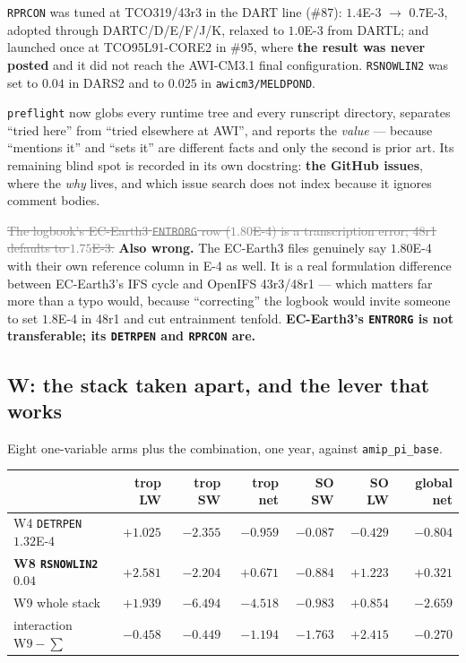 \documentclass[10pt]{article}
\newcommand{\dead}[1]{\textcolor{gray}{\sout{#1}}}
\begin{document}
\texttt{RPRCON} was tuned at TCO319/43r3 in the DART line (\#87): $1.4$E-3 $\to$
$0.7$E-3, adopted through DARTC/D/E/F/J/K, relaxed to $1.0$E-3 from DARTL; and launched
once at TCO95L91-CORE2 in \#95, where \textbf{the result was never posted} and it did not
reach the AWI-CM3.1 final configuration. \texttt{RSNOWLIN2} was set to $0.04$ in DARS2 and
to $0.025$ in \texttt{awicm3/MELDPOND}.

\texttt{preflight} now globs every runtime tree and every runscript directory, separates
``tried here'' from ``tried elsewhere at AWI'', and reports the \emph{value} --- because
``mentions it'' and ``sets it'' are different facts and only the second is prior art. Its
remaining blind spot is recorded in its own docstring: \textbf{the GitHub issues}, where
the \emph{why} lives, and which issue search does not index because it ignores comment
bodies.

\dead{The logbook's EC-Earth3 \texttt{ENTRORG} row ($1.80$E-4) is a transcription error;
48r1 defaults to $1.75$E-3.} \textbf{Also wrong.} The EC-Earth3 files genuinely say
$1.80$E-4 with their own reference column in E-4 as well. It is a real formulation
difference between EC-Earth3's IFS cycle and OpenIFS 43r3/48r1 --- which matters far more
than a typo would, because ``correcting'' the logbook would invite someone to set
$1.8$E-4 in 48r1 and cut entrainment tenfold. \textbf{EC-Earth3's \texttt{ENTRORG} is not
transferable; its \texttt{DETRPEN} and \texttt{RPRCON} are.}

\subsection{W: the stack taken apart, and the lever that works}\label{sub:r27w}
Eight one-variable arms plus the combination, one year, against \texttt{amip\_pi\_base}.

\begin{center}\footnotesize
\begin{tabular}{l r r r r r r}
\toprule
& trop LW & trop SW & trop net & SO SW & SO LW & global net \\
\midrule
W4 \texttt{DETRPEN} $1.32$E-4 & $+1.025$ & $-2.355$ & $-0.959$ & $-0.087$ & $-0.429$ & $-0.804$ \\
\textbf{W8 \texttt{RSNOWLIN2} $0.04$} & $\mathbf{+2.581}$ & $-2.204$ & $+0.671$ & $-0.884$ & $+1.223$ & $+0.321$ \\
W9 whole stack & $+1.939$ & $-6.494$ & $\mathbf{-4.518}$ & $-0.983$ & $+0.854$ & $\mathbf{-2.659}$ \\
\midrule
interaction $\mathrm{W9}-\sum$ & $-0.458$ & $-0.449$ & $-1.194$ & $-1.763$ & $\mathbf{+2.415}$ & $-0.270$ \\
\bottomrule
\end{tabular}
\end{center}
\end{document}
